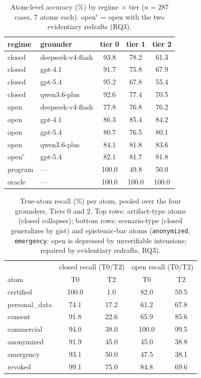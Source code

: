 \begin{table}[h]
\centering
\small
\begin{tabular}{llccc}
\toprule
regime & grounder & tier 0 & tier 1 & tier 2 \\
\midrule
closed & deepseek-v4-flash & 93.8 & 78.2 & 61.3 \\
closed & gpt-4.1           & 91.7 & 75.8 & 67.9 \\
closed & gpt-5.4           & 95.2 & 67.8 & 55.4 \\
closed & qwen3.6-plus      & 92.6 & 77.4 & 70.5 \\
open   & deepseek-v4-flash & 77.8 & 76.8 & 76.2 \\
open   & gpt-4.1           & 86.3 & 85.4 & 84.2 \\
open   & gpt-5.4           & 80.7 & 76.5 & 80.1 \\
open   & qwen3.6-plus      & 84.1 & 81.8 & 83.6 \\
open$^{r}$ & gpt-5.4       & 82.1 & 81.7 & 81.8 \\
\midrule
program & ---              & 100.0 & 49.8 & 50.0 \\
oracle  & ---              & 100.0 & 100.0 & 100.0 \\
\bottomrule
\end{tabular}
\caption{Atom-level accuracy (\%) by regime $\times$ tier ($n=287$ cases,
7 atoms each). open$^{r}$ = open with the two evidentiary redrafts (RQ3).}
\label{tab:atomfull}
\end{table}

\begin{table}[h]
\centering
\small
\begin{tabular}{lcc|cc}
\toprule
 & \multicolumn{2}{c|}{closed recall (T0/T2)} &
   \multicolumn{2}{c}{open recall (T0/T2)} \\
atom & T0 & T2 & T0 & T2 \\
\midrule
certified      & 100.0 & 1.0  & 82.0 & 59.5 \\
personal\_data & 74.1  & 17.2 & 61.2 & 67.8 \\
consent        & 91.8  & 22.6 & 65.9 & 85.6 \\
commercial     & 94.0  & 38.0 & 100.0 & 99.5 \\
anonymized     & 91.9  & 45.0 & 45.0 & 38.8 \\
emergency      & 93.1  & 50.0 & 47.5 & 38.1 \\
revoked        & 99.1  & 75.0 & 84.8 & 69.6 \\
\bottomrule
\end{tabular}
\caption{True-atom recall (\%) per atom, pooled over the four grounders,
Tiers 0 and 2. Top rows: artifact-type atoms (closed collapses); bottom
rows: scenario-type (closed generalizes by gist) and epistemic-bar atoms
(\texttt{anonymized}, \texttt{emergency}: open is depressed by unverifiable
intensions; repaired by evidentiary redrafts, RQ3).}
\label{tab:peratom}
\end{table}

